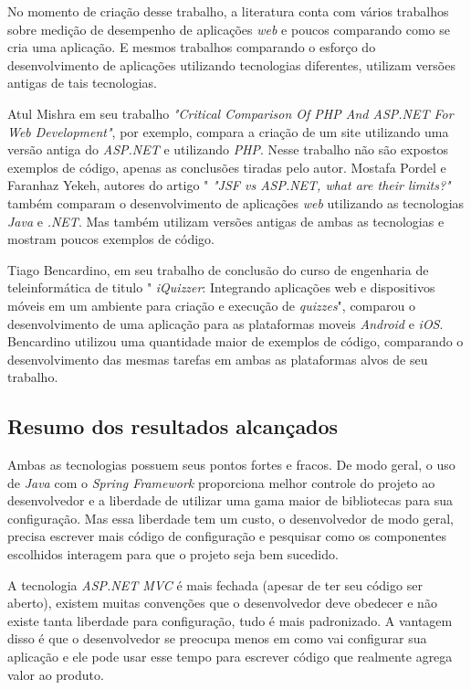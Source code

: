 \documentclass[a4paper,12pt]{article}
\newcommand{\est}[1] {
\textit{#1}}
\newcommand{\sigla}[1] {
\textit{#1}}
\newcommand{\lang}[1] {
\textit{#1}}
\newcommand{\lib}[1] {
\textit{#1}}
\begin{document}
No momento de criação desse trabalho, a literatura conta com vários trabalhos sobre medição de desempenho de aplicações \est{web} e poucos comparando como se cria uma aplicação. E mesmos trabalhos comparando o esforço do desenvolvimento de aplicações utilizando tecnologias diferentes, utilizam versões antigas de tais tecnologias. 

Atul Mishra em seu trabalho \est{"Critical Comparison Of PHP And ASP.NET For Web Development"}, por exemplo, compara a criação de um site utilizando uma versão antiga do \sigla{ASP.NET} e utilizando \sigla{PHP}. Nesse trabalho não são expostos exemplos de código, apenas as conclusões tiradas pelo autor. Mostafa Pordel e Faranhaz Yekeh, autores do artigo "\est{"JSF vs ASP.NET, what are their limits?"} também comparam o desenvolvimento de aplicações \est{web} utilizando as tecnologias \lang{Java} e \lib{.NET}. Mas também utilizam versões antigas de ambas as tecnologias e mostram poucos exemplos de código.

Tiago Bencardino, em seu trabalho de conclusão do curso de engenharia de teleinformática de titulo "\est{iQuizzer}: Integrando aplicações web e dispositivos móveis em um ambiente para criação e execução de \est{quizzes}", comparou o desenvolvimento de uma aplicação para as plataformas moveis \est{Android} e \est{iOS}. Bencardino utilizou uma quantidade maior de exemplos de código, comparando o desenvolvimento das mesmas tarefas em ambas as plataformas alvos de seu trabalho.

\subsection{Resumo dos resultados alcançados}

Ambas as tecnologias possuem seus pontos fortes e fracos. De modo geral, o uso de \lang{Java} com o \lib{Spring Framework} proporciona melhor controle do projeto ao desenvolvedor e a liberdade de utilizar uma gama maior de bibliotecas para sua configuração. Mas essa liberdade tem um custo, o desenvolvedor de modo geral, precisa escrever mais código de configuração e pesquisar como os componentes escolhidos interagem para que o projeto seja bem sucedido.

A tecnologia \sigla{ASP.NET MVC} é mais fechada (apesar de ter seu código ser aberto), existem muitas convenções que o desenvolvedor deve obedecer e não existe tanta liberdade para configuração, tudo é mais padronizado. A vantagem disso é que o desenvolvedor se preocupa menos em como vai configurar sua aplicação e ele pode usar esse tempo para escrever código que realmente agrega valor ao produto.
\end{document}
